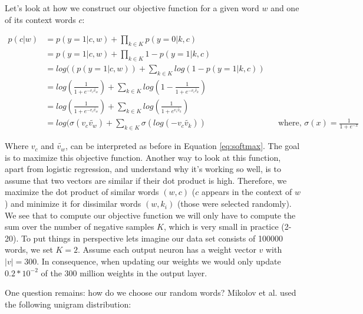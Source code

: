 \documentclass[conference]{IEEEtran}
\begin{document}
Let's look at how we construct our objective function for a given word $w$ and one of its context words $c$:

\begin{align*}
p(c|w) &= p(y=1|c,w) + \prod_{k\in K} p(y=0|k,c)
\\&= p(y=1|c,w) + \prod_{k\in K} 1- p(y=1|k,c)
\\&= log((p(y=1|c,w)) + \sum_{k\in K} log(1- p(y=1|k,c))
\\&= log(\frac{1}{1+e^{-v_c \tilde{v_w }}}) + \sum_{k\in K} log(1-\frac{1}{1+e^{-v_c \tilde{v_k}}})
\\&= log(\frac{1}{1+e^{-v_c \tilde{v_w } }}) + \sum_{k\in K} log(\frac{1}{1+e^{v_c \tilde{v_k} }})
\\&= log(\sigma(v_c \tilde{v_w } ) + \sum_{k\in K} \sigma(log(-v_c \tilde{v_k} )) &&\text{where, $\sigma(x) = \frac{1}{1+e^{-x}}$}
\end{align*}\label{eq:obj_neg_samples}

Where $v_c$ and $\tilde{v_w }$, can be interpreted as before in Equation \ref{eq:softmax}. The goal is to maximize this objective function. Another way to look at this function, apart from logistic regression, and understand why it's working so well, is to assume that two vectors are similar if their dot product is high. Therefore, we maximize the dot product of similar words $(w,c)$ ($c$ appears in the context of $w$) and minimize it for dissimilar words $(w,k_i)$ (those were selected randomly).
We see that to compute our objective function we will only have to compute the sum over the number of negative samples $K$, which is very small in practice (2-20). To put things in perspective lets imagine our data set consists of 100000 words, we set $K=2$. Assume each output neuron has a weight vector $v$ with $|v| = 300$. In consequence, when updating our weights we would only update $0.2*10^{-2}$ of the 300 million weights in the output layer.

One question remains: how do we choose our random words? Mikolov et al. \cite{mikolov2} used the following unigram distribution:
\end{document}
